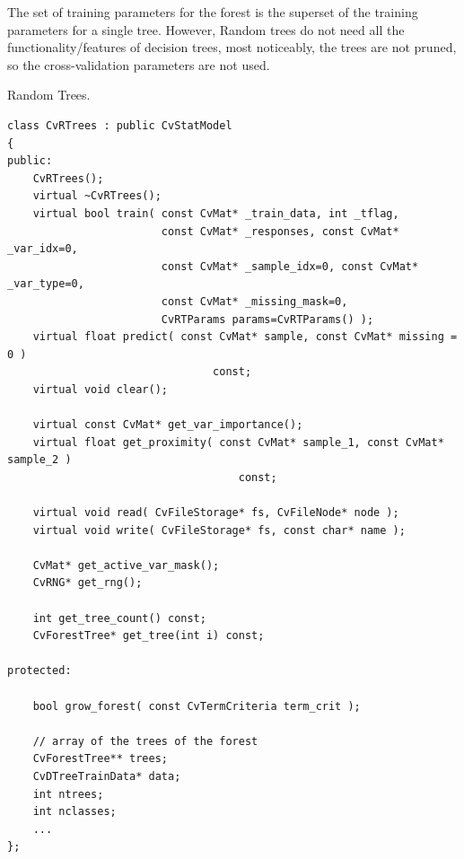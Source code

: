 \begin{description}
\end{description}

The set of training parameters for the forest is the superset of the training parameters for a single tree. However, Random trees do not need all the functionality/features of decision trees, most noticeably, the trees are not pruned, so the cross-validation parameters are not used.



Random Trees.

\begin{lstlisting}
class CvRTrees : public CvStatModel
{
public:
    CvRTrees();
    virtual ~CvRTrees();
    virtual bool train( const CvMat* _train_data, int _tflag,
                        const CvMat* _responses, const CvMat* _var_idx=0,
                        const CvMat* _sample_idx=0, const CvMat* _var_type=0,
                        const CvMat* _missing_mask=0,
                        CvRTParams params=CvRTParams() );
    virtual float predict( const CvMat* sample, const CvMat* missing = 0 ) 
								const;
    virtual void clear();

    virtual const CvMat* get_var_importance();
    virtual float get_proximity( const CvMat* sample_1, const CvMat* sample_2 ) 
									const;

    virtual void read( CvFileStorage* fs, CvFileNode* node );
    virtual void write( CvFileStorage* fs, const char* name );

    CvMat* get_active_var_mask();
    CvRNG* get_rng();

    int get_tree_count() const;
    CvForestTree* get_tree(int i) const;

protected:

    bool grow_forest( const CvTermCriteria term_crit );

    // array of the trees of the forest
    CvForestTree** trees;
    CvDTreeTrainData* data;
    int ntrees;
    int nclasses;
    ...
};

\end{lstlisting}



